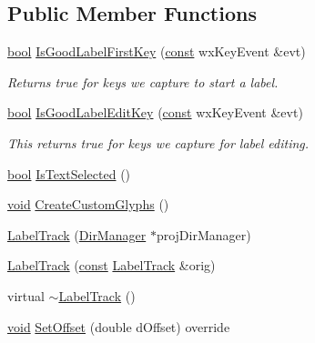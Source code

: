 \subsection*{Public Member Functions}
\begin{DoxyCompactItemize}
\item 
\hyperlink{mac_2config_2i386_2lib-src_2libsoxr_2soxr-config_8h_abb452686968e48b67397da5f97445f5b}{bool} \hyperlink{class_label_track_a34303d1b56a6ca8712c164b38ecf6251}{Is\+Good\+Label\+First\+Key} (\hyperlink{getopt1_8c_a2c212835823e3c54a8ab6d95c652660e}{const} wx\+Key\+Event \&evt)
\begin{DoxyCompactList}\small\item\em Returns true for keys we capture to start a label. \end{DoxyCompactList}\item 
\hyperlink{mac_2config_2i386_2lib-src_2libsoxr_2soxr-config_8h_abb452686968e48b67397da5f97445f5b}{bool} \hyperlink{class_label_track_aa669dd3a7a1636e29983e7d0a71b816b}{Is\+Good\+Label\+Edit\+Key} (\hyperlink{getopt1_8c_a2c212835823e3c54a8ab6d95c652660e}{const} wx\+Key\+Event \&evt)
\begin{DoxyCompactList}\small\item\em This returns true for keys we capture for label editing. \end{DoxyCompactList}\item 
\hyperlink{mac_2config_2i386_2lib-src_2libsoxr_2soxr-config_8h_abb452686968e48b67397da5f97445f5b}{bool} \hyperlink{class_label_track_a394fa271aa242ed202f2d4c647c94736}{Is\+Text\+Selected} ()
\item 
\hyperlink{sound_8c_ae35f5844602719cf66324f4de2a658b3}{void} \hyperlink{class_label_track_ac2477fc2203f388831307ed740bfd60f}{Create\+Custom\+Glyphs} ()
\item 
\hyperlink{class_label_track_a0d34a7c02790a858a53892c5c8ab196a}{Label\+Track} (\hyperlink{class_dir_manager}{Dir\+Manager} $\ast$proj\+Dir\+Manager)
\item 
\hyperlink{class_label_track_a0ab264e29f52e40ab65cc79a78261065}{Label\+Track} (\hyperlink{getopt1_8c_a2c212835823e3c54a8ab6d95c652660e}{const} \hyperlink{class_label_track}{Label\+Track} \&orig)
\item 
virtual \hyperlink{class_label_track_a09d4e95b0057ea507f0879c7c6e1e350}{$\sim$\+Label\+Track} ()
\item 
\hyperlink{sound_8c_ae35f5844602719cf66324f4de2a658b3}{void} \hyperlink{class_label_track_ac535bbd9a134eae2fa5c75ba7efe16a6}{Set\+Offset} (double d\+Offset) override

\end{DoxyCompactItemize}
